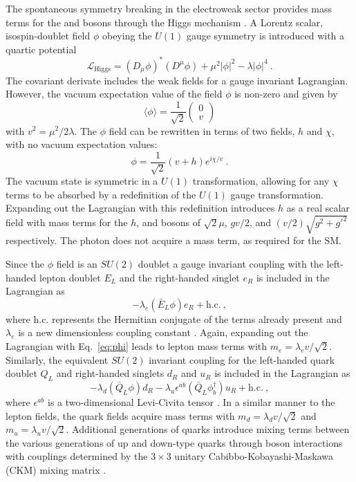 The spontaneous symmetry breaking in the electroweak sector provides mass terms for the \PW and \PZ bosons through the Higgs mechanism \cite{PhysRevLett.13.321,PhysRevLett.13.508,PhysRevLett.13.585}. A Lorentz scalar, isospin-doublet field $\phi$ obeying the $U(1)$ gauge symmetry is introduced with a quartic potential
%
\begin{equation}
    \mathcal{L}_{\mathrm{Higgs}} = (D_\mu\phi)^*(D^\mu\phi) +\mu^2|\phi|^2 - \lambda|\phi|^4\ .
\end{equation}
%
The covariant derivate includes the weak fields for a gauge invariant Lagrangian. However, the vacuum expectation value of the field $\phi$ is non-zero and given by
%
\begin{equation}
    \langle \phi \rangle = \frac{1}{\sqrt{2}}
    \begin{pmatrix}
        0 \\ v
    \end{pmatrix}
\end{equation}
%
with $v^2=\mu^2/2\lambda$. The $\phi$ field can be rewritten in terms of two fields, $h$ and $\chi$, with no vacuum expectation values:
%
\begin{equation}\label{eq:phi}
    \phi = \frac{1}{\sqrt{2}}(v + h)e^{i\chi/v}\ .
\end{equation}
%
The vacuum state is symmetric in a $U(1)$ transformation, allowing for any $\chi$ terms to be absorbed by a redefinition of the $U(1)$ gauge transformation. Expanding out the Lagrangian with this redefinition introduces $h$ as a real scalar field with mass terms for the $h$, \PW and \PZ bosons of $\sqrt{2}\mu$, $gv/2$, and $(v/2)\sqrt{g^2+g'^2}$ respectively. The photon does not acquire a mass term, as required for the SM.

Since the $\phi$ field is an $SU(2)$ doublet a gauge invariant coupling with the left-handed lepton doublet $E_L$ and the right-handed singlet $e_R$ is included in the Lagrangian as
%
\begin{equation}
    -\lambda_e (\bar{E}_L \phi) e_R + \mathrm{h.c.}\ ,
\end{equation}
%
where h.c. represents the Hermitian conjugate of the terms already present and $\lambda_e$ is a new dimensionless coupling constant \cite{Peskin:1995ev}.  Again, expanding out the Lagrangian with Eq.~\ref{eq:phi} leads to lepton mass terms with $m_e = \lambda_e v/\sqrt{2}$. Similarly, the equivalent $SU(2)$ invariant coupling for the left-handed quark doublet $Q_L$ and right-handed singlets $d_R$ and $u_R$ is included in the Lagrangian as
%
\begin{equation}
    -\lambda_d (\bar{Q}_L\phi) d_R - \lambda_u \epsilon^{ab}(\bar{Q}_L\phi_b^{\dagger})u_R + \mathrm{h.c.}\ ,
\end{equation}
%
where $\epsilon^{ab}$ is a two-dimensional Levi-Civita tensor \cite{Peskin:1995ev}.  In a similar manner to the lepton fields, the quark fields acquire mass terms with $m_d = \lambda_d v/\sqrt{2}$ and $m_u = \lambda_u v/\sqrt{2}$. Additional generations of quarks introduce mixing terms between the various generations of up and down-type quarks through \PW boson interactions with couplings determined by the $3\times 3$ unitary Cabibbo-Kobayashi-Maskawa (CKM) mixing matrix \cite{PhysRevLett.10.531,Kobayashi:1973fv}.

